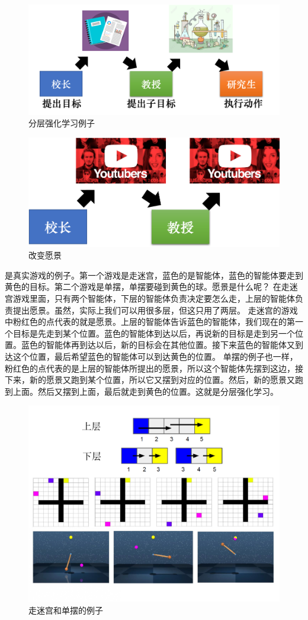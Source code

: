 \begin{figure}[htb]
    \centering
    \includegraphics[width=0.5\linewidth]{res/ch10/10.9a}
    \caption{分层强化学习例子}
    \label{fig:10.9a}
\end{figure}

\begin{figure}[htb]
    \centering
    \includegraphics[width=0.5\linewidth]{res/ch10/10.9b}
    \caption{改变愿景}
    \label{fig:10.9b}
\end{figure}

 是真实游戏的例子。第一个游戏是走迷宫，蓝色的是智能体，蓝色的智能体要走到黄色的目标。第二个游戏是单摆，单摆要碰到黄色的球。愿景是什么呢？
在走迷宫游戏里面，只有两个智能体，下层的智能体负责决定要怎么走，上层的智能体负责提出愿景。虽然，实际上我们可以用很多层，但这只用了两层。
走迷宫的游戏中粉红色的点代表的就是愿景。上层的智能体告诉蓝色的智能体，我们现在的第一个目标是先走到某个位置。蓝色的智能体到达以后，再说新的目标是走到另一个位置。蓝色的智能体再到达以后，新的目标会在其他位置。接下来蓝色的智能体又到达这个位置，最后希望蓝色的智能体可以到达黄色的位置。
单摆的例子也一样，粉红色的点代表的是上层的智能体所提出的愿景，所以这个智能体先摆到这边，接下来，新的愿景又跑到某个位置，所以它又摆到对应的位置。然后，新的愿景又跑到上面。然后又摆到上面，最后就走到黄色的位置。这就是分层强化学习。

\begin{figure}[htb]
    \centering
    \includegraphics[width=0.5\linewidth]{res/ch10/10.10}
    \caption{走迷宫和单摆的例子}
    \label{fig:fig10.10}
\end{figure}

